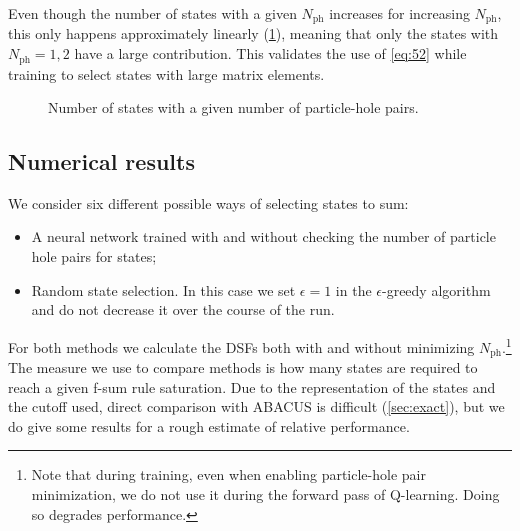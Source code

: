 \documentclass[11pt, a4paper]{report} %
\begin{document}
Even though the number of states with a given \(N_{\mathrm{ph}}\) increases for increasing \(N_{\mathrm{ph}}\), this only happens approximately linearly (\cref{fig:numberofstatesph}), meaning that only the states with \(N_{\mathrm{ph}}=1,2\) have a large contribution.
This validates the use of \cref{eq:52} while training to select states with large matrix elements.
\begin{figure}[tb!]
  \centering
  \caption{Number of states with a given number of particle-hole pairs.}\label{fig:numberofstatesph}
\end{figure}




\subsection{Numerical results}


We consider six different possible ways of selecting states to sum:
\begin{itemize}
\item A neural network trained with and without checking the number of particle hole pairs for states;
\item Random state selection. In this case we set \(\epsilon=1\) in the \(\epsilon\)-greedy algorithm and do not decrease it over the course of the run.
\end{itemize}
For both methods we calculate the DSFs both with and without minimizing \(N_{\mathrm{ph}}\).\footnote{Note that during training, even when enabling particle-hole pair minimization, we do not use it during the forward pass of Q-learning. Doing so degrades performance.}
The measure we use to compare methods is how many states are required to reach a given f-sum rule saturation.
Due to the representation of the states and the cutoff used, direct comparison with ABACUS is difficult (\cref{sec:exact}), but we do give some results for a rough estimate of relative performance.
\end{document}
